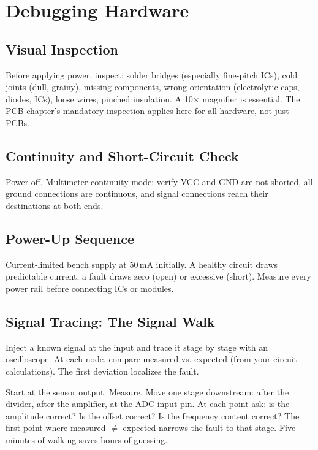 \section{Debugging Hardware}

\subsection{Visual Inspection}
Before applying power, inspect: solder bridges (especially fine-pitch ICs), cold joints (dull, grainy), missing components, wrong orientation (electrolytic caps, diodes, ICs), loose wires, pinched insulation. A 10$\times$ magnifier is essential. The PCB chapter's mandatory inspection applies here for all hardware, not just PCBs.

\subsection{Continuity and Short-Circuit Check}
Power off. Multimeter continuity mode: verify VCC and GND are not shorted, all ground connections are continuous, and signal connections reach their destinations at both ends.

\subsection{Power-Up Sequence}
Current-limited bench supply at 50\,mA initially. A healthy circuit draws predictable current; a fault draws zero (open) or excessive (short). Measure every power rail before connecting ICs or modules.

\subsection{Signal Tracing: The Signal Walk}
Inject a known signal at the input and trace it stage by stage with an oscilloscope. At each node, compare measured vs. expected (from your circuit calculations). The first deviation localizes the fault.

\begin{tipbox}
Start at the sensor output. Measure. Move one stage downstream: after the divider, after the amplifier, at the ADC input pin. At each point ask: is the amplitude correct? Is the offset correct? Is the frequency content correct? The first point where measured $\neq$ expected narrows the fault to that stage. Five minutes of walking saves hours of guessing.
\end{tipbox}

